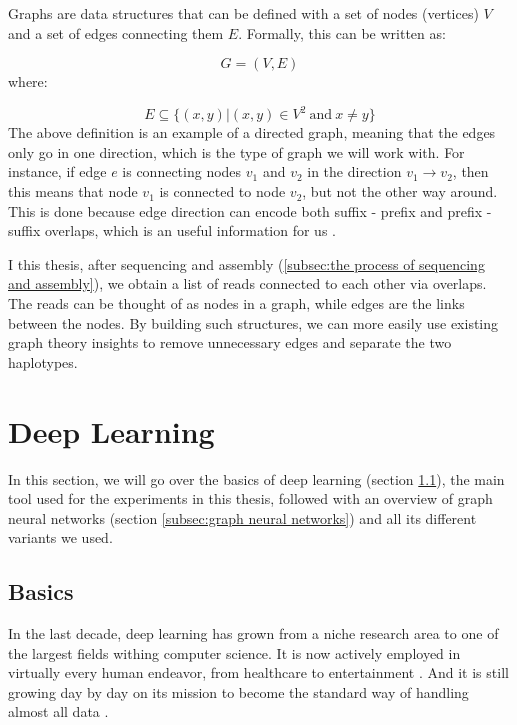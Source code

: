 \documentclass[times, utf8, diplomski, english]{fer_eng}
\begin{document}
Graphs are data structures that can be defined with a set of nodes (vertices) $V$ and a set of edges connecting them $E$. Formally, this can be written as:

\[ G = (V, E) \]
where:

\[ E \subseteq 	\{ (x, y)|(x, y) \in V^2 \mathrm{\ and\ } x \neq y \} \]
The above definition is an example of a directed graph, meaning that the edges only go in one direction, which is the type of graph we will work with. For instance, if edge $e$ is connecting nodes $v_1$ and $v_2$ in the direction $v_1 \rightarrow v_2$, then this means that node $v_1$ is connected to node $v_2$, but not the other way around. This is done because edge direction can encode both suffix - prefix and prefix - suffix overlaps, which is an useful information for us \cite{trudeau_2017}.

I this thesis, after sequencing and assembly (\ref{subsec:the process of sequencing and assembly}), we obtain a list of reads connected to each other via overlaps. The reads can be thought of as nodes in a graph, while edges are the links between the nodes. By building such structures, we can more easily use existing graph theory insights to remove unnecessary edges and separate the two haplotypes.

\section{Deep Learning}

In this section, we will go over the basics of deep learning (section \ref{subsec:basics}), the main tool used for the experiments in this thesis, followed with an overview of graph neural networks (section \ref{subsec:graph neural networks}) and all its different variants we used.

\subsection{Basics}
\label{subsec:basics}

In the last decade, deep learning has grown from a niche research area to one of the largest fields withing computer science. It is now actively employed in virtually every human endeavor, from healthcare to entertainment \cite{dl_applications}. And it is still growing day by day on its mission to become the standard way of handling almost all data \cite{dl_growth}.
\end{document}

